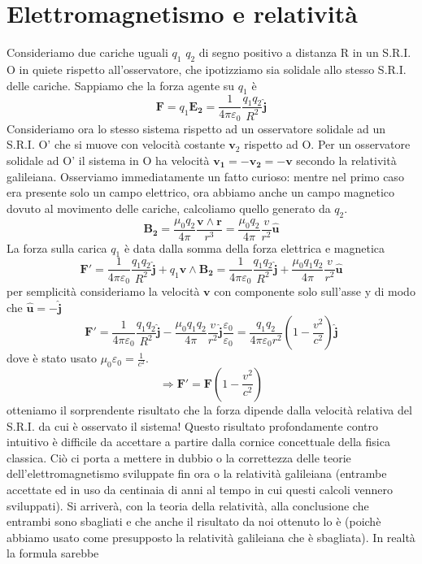\documentclass[
10pt, %
a4paper, %
oneside, %
headinclude,footinclude, %
BCOR5mm, %
]{scrartcl}
\begin{document}
\section{Elettromagnetismo e relatività}\label{ap:relatività}
Consideriamo due cariche uguali \(q_1\) \(q_2\) di segno positivo a distanza R in un S.R.I. O in quiete rispetto all'osservatore, che ipotizziamo sia solidale allo stesso S.R.I. delle cariche. Sappiamo che la forza agente su \(q_1\) è
\[\mathbf{F}=q_1 \mathbf{E_2}= \frac{1}{4\pi\varepsilon_0}\frac{q_1q_2}{R^2}\mathbf{\hat{j}}\]
Consideriamo ora lo stesso sistema rispetto ad un osservatore solidale ad un S.R.I. O' che si muove con velocità costante \(\mathbf{v}_2\) rispetto ad O. Per un osservatore solidale ad O' il sistema in O ha velocità \(\mathbf{v_1}=-\mathbf{v_2}= -\mathbf{v}\) secondo la relatività galileiana. Osserviamo immediatamente un fatto curioso: mentre nel primo caso era presente solo un campo elettrico, ora abbiamo anche un campo magnetico dovuto al movimento delle cariche, calcoliamo quello generato da \(q_2\). 
\[\mathbf{B_2}= \frac{\mu_0q_2}{4\pi}\frac{\mathbf{v}\wedge\mathbf{r}}{r^3}=\frac{\mu_0q_2}{4\pi}\frac{v}{r^2}\mathbf{\hat{u}}\]
La forza sulla carica \(q_1\) è data dalla somma della forza elettrica e magnetica
\[\mathbf{F'}= \frac{1}{4\pi\varepsilon_0}\frac{q_1q_2}{R^2}\mathbf{\hat{j}}+q_1\mathbf{v}\wedge\mathbf{B_2}=\frac{1}{4\pi\varepsilon_0}\frac{q_1q_2}{R^2}\mathbf{\hat{j}}+\frac{\mu_0q_1q_2}{4\pi}\frac{v}{r^2}\mathbf{\hat{u}}\]
per semplicità consideriamo la velocità \(\mathbf{v}\) con componente solo sull'asse y di modo che \(\mathbf{\hat{u}}= - \mathbf{\hat{j}}\)
\[\mathbf{F'}= \frac{1}{4\pi\varepsilon_0}\frac{q_1q_2}{R^2}\mathbf{\hat{j}}-\frac{\mu_0q_1q_2}{4\pi}\frac{v}{r^2}\mathbf{\hat{j}}\frac{\varepsilon_0}{\varepsilon_0}=\frac{q_1q_2}{4\pi\varepsilon_0 r^2}\left(1-\frac{v^2}{c^2}\right)\mathbf{\hat{j}}\]
dove è stato usato \(\mu_0\varepsilon_0 = \frac{1}{c^2}\). 
\[\Rightarrow \mathbf{F'}=\mathbf{F}\left(1-\frac{v^2}{c^2}\right)\]
otteniamo il sorprendente risultato che la forza dipende dalla velocità relativa del S.R.I. da cui è osservato il sistema! Questo risultato profondamente contro intuitivo è difficile da accettare a partire dalla cornice concettuale della fisica classica. Ciò ci porta a mettere in dubbio o la correttezza delle teorie dell'elettromagnetismo sviluppate fin ora o la relatività galileiana (entrambe accettate ed in uso da centinaia di anni al tempo in cui questi calcoli vennero sviluppati). Si arriverà, con la teoria della relatività, alla conclusione che entrambi sono sbagliati e che anche il risultato da noi ottenuto lo è (poichè abbiamo usato come presupposto la relatività galileiana che è sbagliata). In realtà la formula sarebbe
\end{document}
